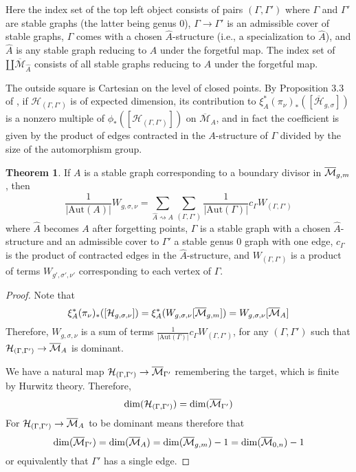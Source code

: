 \documentclass[thesis]{thesis-umich}           %
\newcommand{\Aut}{\text{Aut}}
\newcommand{\Hb}{\overline{\mathcal H}}
\theoremstyle{definition}
\newtheorem{thm}{Theorem}[section]
\begin{document}
Here the index set of the top left object
consists of pairs $(\Gamma,\Gamma')$
where $\Gamma$ and $\Gamma'$ are stable graphs (the latter being genus $0$), $\Gamma\to\Gamma'$ is an admissible cover of stable graphs, $\Gamma$
comes with a chosen $\hat A$-structure (i.e., a specialization to $\hat A$),
and $\hat A$ is any stable graph reducing to $A$ under the forgetful map.
The index set of $\amalg\overline{\mathcal M}_{\hat A}$ consists of
all stable graphs reducing to $A$ under the forgetful map.

The outside square is Cartesian on the level of closed points. By
Proposition 3.3 of \cite{Lian}, if $\mathcal H_{(\Gamma,\Gamma')}$ is of
expected dimension, its contribution to $\xi_A^*(\pi_{\nu})_*([\Hb_{g,\sigma}])$
is a nonzero multiple of $\phi_*([\mathcal H_{(\Gamma,\Gamma')}])$ on $\overline{\mathcal M}_A$, and in fact the coefficient is given by the product of edges contracted in the $A$-structure of $\Gamma$ divided by the size of the automorphism group.%

\begin{thm}
  \label{thm:admissible}
  If $A$ is a stable graph corresponding to a boundary divisor in $\overline{\mathcal M}_{g,m}$, then
  \[
  \frac 1{|\Aut(A)|}W_{g,\sigma,\nu}=\sum_{\hat A\rightsquigarrow A}\sum_{(\Gamma,\Gamma')}\frac 1{|\Aut(\Gamma)|}c_{\Gamma}W_{(\Gamma,\Gamma')}
  \]
  where $\hat A$ becomes $A$ after forgetting points, $\Gamma$ is a stable graph with a chosen $\hat A$-structure and an admissible
  cover to $\Gamma'$ a stable genus $0$ graph with one edge, $c_{\Gamma}$ is the
  product of contracted edges in the $\hat A$-structure, and
  $W_{(\Gamma,\Gamma')}$ is a product of terms $W_{g',\sigma',\nu'}$ corresponding to each vertex of $\Gamma$.
\end{thm}

\begin{proof}
  Note that
  \[
  \xi_A^*(\pi_{\nu})_*([\mathcal H_{g,\sigma,\nu}]) =
  \xi_A^*(W_{g,\sigma,\nu}[\overline{\mathcal M}_{g,m}])=
  W_{g,\sigma,\nu}[\overline{\mathcal M}_A]
  \]
  Therefore, $W_{g,\sigma,\nu}$ is a sum of
  terms $\frac 1{|\Aut(\Gamma)|}c_{\Gamma}W_{(\Gamma,\Gamma')}$, for
  any $(\Gamma,\Gamma')$ such that
  $\mathcal H_{(\Gamma,\Gamma')}\to\overline{\mathcal M}_A$
  is dominant.

  We have a natural map $\mathcal H_{(\Gamma,\Gamma')}\to \overline{\mathcal M}_{\Gamma'}$ remembering the target, which is finite by Hurwitz theory. Therefore,
  \[
  \dim(\mathcal H_{(\Gamma,\Gamma')})=\dim(\overline{\mathcal M}_{\Gamma'})
  \]
  For $\mathcal H_{(\Gamma,\Gamma')}\to\overline{\mathcal M}_A$ to be
  dominant means therefore that
  \[
  \dim(\overline{\mathcal M}_{\Gamma'})=\dim(\overline{\mathcal M}_A)=
  \dim(\overline{\mathcal M}_{g,m})-1=\dim(\overline{\mathcal M}_{0,n})-1
  \]
  or equivalently that $\Gamma'$ has a single edge.
\end{proof}
\end{document}
